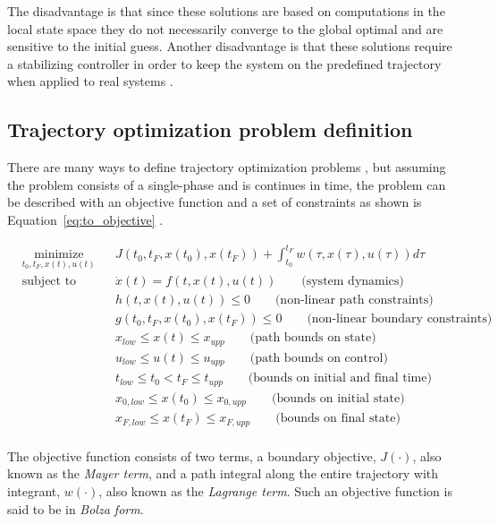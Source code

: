 The disadvantage is that since these solutions are based on computations in the local state space they do not necessarily converge to the global optimal and are sensitive to the initial guess. Another disadvantage is that these solutions require a stabilizing controller in order to keep the system on the predefined trajectory when applied to real systems \cite{kelly2017introduction}.

\subsection{Trajectory optimization problem definition}
There are many ways to define trajectory optimization problems \cite{rao2009survey}, but assuming the problem consists of a single-phase and is continues in time, the problem can be described with an objective function and a set of constraints as shown is Equation~\ref{eq:to_objective} \cite{kelly2017introduction}. 

\begin{equation}
    \begin{aligned}
    & \underset{t_0, t_F, x(t), u(t)}{\text{minimize}}
    & & J\left( t_0, t_F, x(t_0), x(t_F)\right)
        + \int_{t_0}^{t_F} w(\tau, x(\tau), u(\tau)) d\tau \\
    & \text{subject to}
    & & \dot x(t) = f(t, x(t), u(t)) \qquad \text{(system dynamics)} \\
    & & & h(t, x(t), u(t)) \leq 0 \qquad \text{(non-linear path constraints)} \\
    & & & g(t_0, t_F, x(t_0), x(t_F)) \leq 0 \qquad \text{(non-linear boundary constraints)} \\
    & & & x_{low} \leq x(t) \leq x_{upp} \qquad \text{(path bounds on state)} \\
    & & & u_{low} \leq u(t) \leq u_{upp} \qquad \text{(path bounds on control)} \\
    & & & t_{low} \leq t_0 < t_F \leq t_{upp} \qquad \text{(bounds on initial and final time)} \\
    & & & x_{0,low} \leq x(t_0) \leq x_{0,upp} \qquad \text{(bounds on initial state)} \\
    & & & x_{F,low} \leq x(t_F) \leq x_{F,upp} \qquad \text{(bounds on final state)} \\
\end{aligned}
\label{eq:to_objective}
\end{equation}

The objective function consists of two terms, a boundary objective, $J(\cdot)$, also known as the \emph{Mayer term}, and a path integral along the entire trajectory with integrant, $w(\cdot)$, also known as the \emph{Lagrange term}. Such an objective function is said to be in \emph{Bolza form}.

